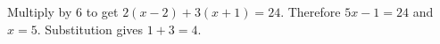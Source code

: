 Multiply by $6$ to get $2(x-2)+3(x+1)=24$. Therefore $5x-1=24$ and $\boxed{x=5}$. Substitution gives $1+3=4$.
